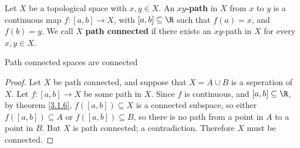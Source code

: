 \begin{definition}
    Let $X$ be a topological space with  $x, y \in X$. An \textbf{$xy$-path} in $X$ from  $x$ to  $y$ is a
    continuous map  $f:[a,b] \rightarrow X$, with $[a,b] \subseteq \R$ such that $f(a)=x$, and
    $f(b)=y$. We call $X$ \textbf {path connected} if there exists an $xy$-path in $X$ for every
    $x,y \in X$.
\end{definition}

\begin{theorem}\label{3.2.3}
    Path connected spaces are connected
\end{theorem}
\begin{proof}
    Let $X$ be path connected, and suppose that  $X=A \cup B$ is a seperation of  $X$. Let  $f:[a,b]
    \rightarrow X$ be some path in $X$. Since  $f$ is continuous, and  $[a,b] \subseteq \R$, by
    theorem \ref{3.1.6}, $f([a,b]) \subseteq X$ is a connected subspace, so either $f([a,b])
    \subseteq A$ or $f([a,b]) \subseteq B$, so there is no path from a point in $A$ to a point in
    $B$. But  $X$ is path connected; a contradiction. Therefore  $X$ must be connected.
\end{proof}

